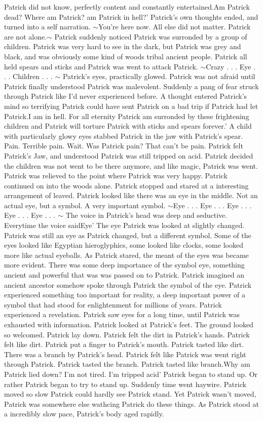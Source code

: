 \documentclass[12pt]{book}
\begin{document}
Patrick did not know, perfectly content and constantly entertained.Am Patrick dead? Where am Patrick? am Patrick in hell?' Patrick's own thoughts ended, and turned into a self narration. $\sim$You're here now. All else did not matter. Patrick are not alone.$\sim$ Patrick suddenly noticed Patrick was surronded by a group of children. Patrick was very hard to see in the dark, but Patrick was grey and black, and was obviously some kind of woods tribal ancient people. Patrick all held spears and sticks and Patrick was went to attack Patrick. $\sim$Crazy . . .  Eye . . .  Children . . .  $\sim$ Patrick's eyes, practically glowed. Patrick was not afraid until Patrick finally understood Patrick was malevolent. Suddenly a pang of fear struck through Patrick like I'd never experienced before. A thought entered Patrick's mind so terrifying Patrick could have sent Patrick on a bad trip if Patrick had let Patrick.I am in hell. For all eternity Patrick am surronded by these frightening children and Patrick will torture Patrick with sticks and spears forever.' A child with particularly glowy eyes stabbed Patrick in the jaw with Patrick's spear. Pain. Terrible pain. Wait. Was Patrick pain? That can't be pain. Patrick felt Patrick's Jaw, and understood Patrick was still tripped on acid. Patrick decided the children was not went to be there anymore, and like magic, Patrick was went. Patrick was relieved to the point where Patrick was very happy. Patrick continued on into the woods alone. Patrick stopped and stared at a interesting arrangement of leaved. Patrick looked like there was an eye in the middle. Not an actual eye, but a symbol. A very important symbol. $\sim$Eye . . .  Eye . . .  Eye . . .  Eye . . .  Eye . . .  $\sim$ The voice in Patrick's head was deep and seductive. Everytime the voice saidEye' The eye Patrick was looked at slightly changed. Patrick was still an eye as Patrick changed, but a different symbol. Some of the eyes looked like Egyptian hieroglyphics, some looked like clocks, some looked more like actual eyeballs. As Patrick stared, the meant of the eyes was became more evident. There was some deep importance of the symbol eye, something ancient and powerful that was was passed on to Patrick. Patrick imagined an ancient ancestor somehow spoke through Patrick the symbol of the eye. Patrick experienced something too important for reality, a deep important power of a symbol that had stood for enlightenment for millions of years. Patrick experienced a revelation. Patrick saw eyes for a long time, until Patrick was exhausted with information. Patrick looked at Patrick's feet. The ground looked so welcomed. Patrick lay down. Patrick felt the dirt in Patrick's hands. Patrick felt like dirt. Patrick put a finger to Patrick's mouth. Patrick tasted like dirt. There was a branch by Patrick's head. Patrick felt like Patrick was went right through Patrick. Patrick tasted the branch. Patrick tasted like branch.Why am Patrick lied down? I'm not tired. I'm tripped acid' Patrick began to stand up. Or rather Patrick began to try to stand up. Suddenly time went haywire. Patrick moved so slow Patrick could hardly see Patrick stand. Yet Patrick wasn't moved, Patrick was somewhere else wathcing Patrick do these things. As Patrick stood at a incredibly slow pace, Patrick's body aged rapidly. 
\end{document}

